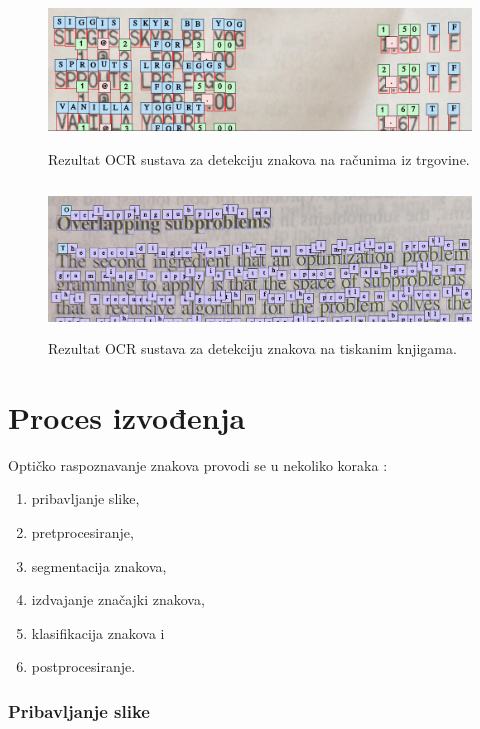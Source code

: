 \documentclass[times, utf8, zavrsni]{fer}
\begin{document}
\begin{figure}[htb]
    \centering
    \includegraphics[height=4cm]{images/receipt-example-01.png}
    \caption{Rezultat OCR sustava za detekciju znakova na računima iz trgovine.}
    \label{fig:receipt-example-01}
\end{figure}

\begin{figure}[htb]
    \centering
    \includegraphics[height=4cm]{images/book-example-01.png}
    \caption{Rezultat OCR sustava za detekciju znakova na tiskanim knjigama.}
    \label{fig:book-example-01}
\end{figure}

\section{Proces izvođenja}

Optičko raspoznavanje znakova provodi se u nekoliko koraka \citep{DBLP:journals/corr/abs-1710-05703} \citep{kaur2016survey}:
\begin{enumerate}
    \item pribavljanje slike,
    \item pretprocesiranje,
    \item segmentacija znakova,
    \item izdvajanje značajki znakova,
    \item klasifikacija znakova i
    \item postprocesiranje.
\end{enumerate}

\subsubsection{Pribavljanje slike}
\end{document}
